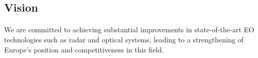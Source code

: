 \subsection{Vision}
\paragraph{} We are committed to achieving substantial improvements in state-of-the-art EO technologies such as radar and optical systems, leading to a strengthening of Europe's position and competitiveness in this field. 


